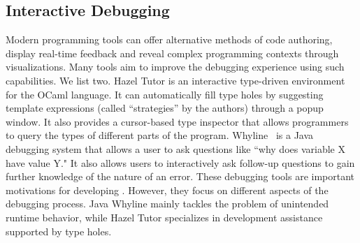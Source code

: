\subsection{Interactive Debugging}


Modern programming tools can offer alternative methods of code authoring, display real-time feedback and reveal complex programming contexts through visualizations. Many tools aim to improve the debugging experience using such capabilities. We list two. Hazel Tutor \cite{Potter2020-tv} is an interactive type-driven environment for the OCaml language. It can automatically fill type holes by suggesting template expressions (called ``strategies'' by the authors) through a popup window. It also provides a cursor-based type inspector that allows programmers to query the types of different parts of the program. Whyline~\cite{Ko2009-uf} is a Java debugging system that allows a user to ask questions like ``why does variable X have value Y." It also allows users to interactively ask follow-up questions to gain further knowledge of the nature of an error. These debugging tools are important motivations for developing \chameleon{}. However, they focus on different aspects of the debugging process. Java Whyline mainly tackles the problem of unintended runtime behavior, while Hazel Tutor specializes in development assistance supported by type holes.





